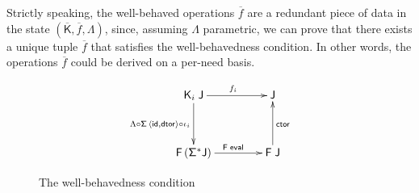 \documentclass[preprint,draft]
{sigplanconf}
\newcommand\TC{\mathsf}
\newcommand{\ov}{\overline}
\newcommand{\<}{\langle}
\renewcommand{\>}{\rangle}
\renewcommand{\l}{\Lambda}
\newcommand{\ctor}{{{\mathsf{ctor}}}}
\newcommand{\dtor}{{{\mathsf{dtor}}}}
\newcommand{\eval}{{{\mathsf{eval}}}}
\newcommand{\id}{\mathsf{{id}}}
\newcommand{\F}{{\TC{F}}}
\newcommand{\J}{{\TC{J}}}
\renewcommand{\SS}{{\TC{\Sigma}}}
\newcommand{\K}{{\TC{K}}}
\begin{document}
Strictly speaking, the well-behaved operations $\ov{f}$ are a redundant piece of data in the state $(\ov{\K},\ov{f},\l)$,
since, assuming $\l$ parametric, we can prove that there exists a unique tuple $\ov{f}$ that satisfies the well-behavedness condition.
In other words, the operations $\ov{f}$ could be derived on a per-need basis.





\begin{figure}
$$
\xymatrix@C=3.5pc@R=3pc{
 \K_i\;\J
\ar^{f_i}[r]
\ar_{\l \mathrel\circ \SS\,\langle\id,\dtor\rangle \mathrel\circ \iota_i}[d]    &  \J
                   \\
\F\,(\SS^*\J)
\ar^{\F\;\eval}[r]  &  \F\;\J \ar_{\ctor}[u]
}
$$
\vspace*{-1ex} \caption{The well-behavedness condition}
\label{fig-reg}
\end{figure}
\end{document}
